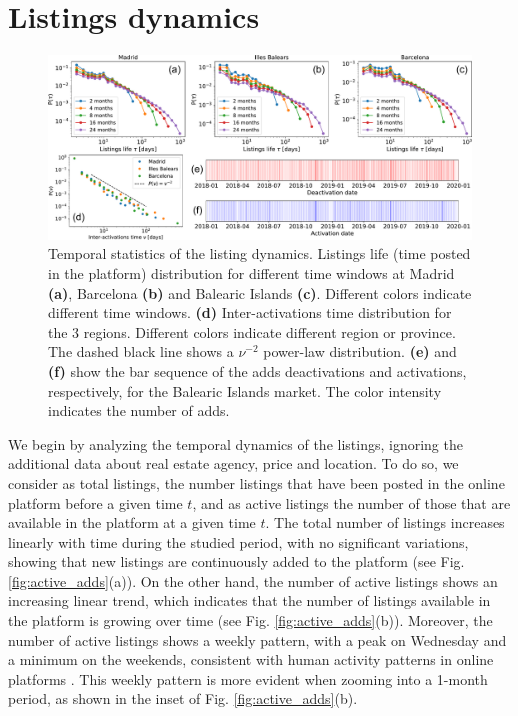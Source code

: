 \section{Listings dynamics}

\begin{figure}
    \centering
    \includegraphics[width =\textwidth]{Figs/Idealista_dynamics/panel_time.pdf}
	\caption[Temporal statistics of the listing dynamics.]{ \label{fig:panel_time} Temporal statistics of the listing dynamics. Listings life (time posted in the platform) distribution for different time windows at Madrid \textbf{(a)}, Barcelona \textbf{(b)} and Balearic Islands \textbf{(c)}. Different colors indicate different time windows. \textbf{(d)} Inter-activations time distribution for the 3 regions. Different colors indicate different region or province. The dashed black line shows a $\nu^{-2}$ power-law distribution. \textbf{(e)} and \textbf{(f)} show the bar sequence of the adds deactivations and activations, respectively, for the Balearic Islands market. The color intensity indicates the number of adds.}
\end{figure}

We begin by analyzing the temporal dynamics of the listings, ignoring the additional data about real estate agency, price and location. To do so, we consider as total listings, the number listings that have been posted in the online platform before a given time $t$, and as active listings the number of those that are available in the platform at a given time $t$. The total number of listings increases linearly with time during the studied period, with no significant variations, showing that new listings are continuously added to the platform (see Fig. \ref{fig:active_adds}(a)). On the other hand, the number of active listings shows an increasing linear trend, which indicates that the number of listings available in the platform is growing over time (see Fig. \ref{fig:active_adds}(b)). Moreover, the number of active listings shows a weekly pattern, with a peak on Wednesday and a minimum on the weekends, consistent with human activity patterns in online platforms \cite{goncalves-2008}. This weekly pattern is more evident when zooming into a 1-month period, as shown in the inset of Fig. \ref{fig:active_adds}(b).

